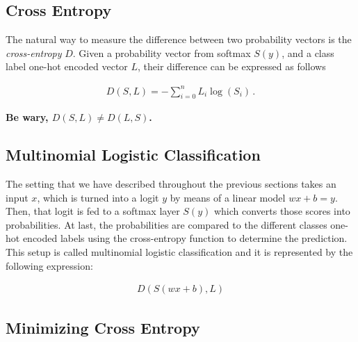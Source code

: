 \documentclass[english, 11pt]{article}
\begin{document}
	\subsection{Cross Entropy}

	The natural way to measure the difference between two probability vectors is the \emph{cross-entropy} $D$. Given a probability vector from softmax $S(y)$, and a class label one-hot encoded vector $L$, their difference can be expressed as follows

	\begin{align*}
		D(S, L) = -\displaystyle\sum_{i=0}^{n}L_i \log(S_i)\,.
	\end{align*}

	\textbf{Be wary, $D(S, L) \neq D(L, S)$.}

	\subsection{Multinomial Logistic Classification}

	The setting that we have described throughout the previous sections takes an input $x$, which is turned into a logit $y$ by means of a linear model $wx + b = y$. Then, that logit is fed to a softmax layer $S(y)$ which converts those scores into probabilities. At last, the probabilities are compared to the different classes one-hot encoded labels using the cross-entropy function to determine the prediction. This setup is called multinomial logistic classification and it is represented by the following expression:

	\begin{align*}
		D(S(wx + b), L)
	\end{align*}

	\subsection{Minimizing Cross Entropy}
  
\end{document}
